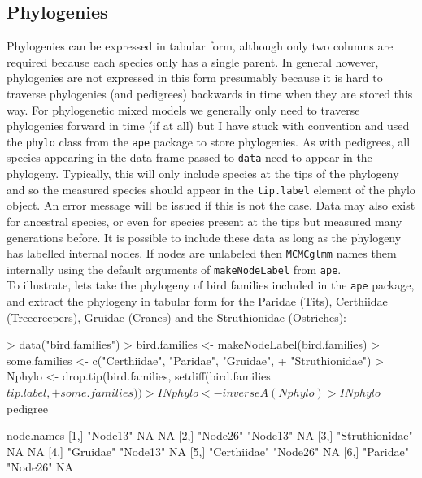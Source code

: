 \documentclass{article}
\begin{document}
\subsection{Phylogenies}

Phylogenies can be expressed in tabular form, although only two columns are required because each species only has a single parent. In general however,  phylogenies are not expressed in this form presumably because it is hard to traverse phylogenies (and pedigrees) backwards in time when they are stored this way. For phylogenetic mixed models we generally only need to traverse phylogenies forward in time (if at all) but I have stuck with convention and used the \texttt{phylo} class from the \texttt{ape} package to store phylogenies.  As with pedigrees, all species appearing in the data frame passed to \texttt{data} need to appear in the phylogeny. Typically, this will only include species at the tips of the phylogeny and so the measured species should appear in the \texttt{tip.label} element of the phylo object. An error message will be issued if this is not the case. Data may also exist for ancestral species, or even for species present at the tips but measured many generations before. It is possible to include these data as long as the phylogeny has labelled internal nodes. If nodes are unlabeled then  \texttt{MCMCglmm}  names them internally using the default arguments of   \texttt{makeNodeLabel} from \texttt{ape}.\\ 

To illustrate, lets take the phylogeny of bird families included in the \texttt{ape} package, and extract the phylogeny in tabular form for the Paridae (Tits), Certhiidae (Treecreepers), Gruidae (Cranes) and the Struthionidae (Ostriches):

\begin{Schunk}
\begin{Sinput}
> data("bird.families")
> bird.families <- makeNodeLabel(bird.families)
> some.families <- c("Certhiidae", "Paridae", "Gruidae", 
+     "Struthionidae")
> Nphylo <- drop.tip(bird.families, setdiff(bird.families$tip.label, 
+     some.families))
> INphylo <- inverseA(Nphylo)
> INphylo$pedigree
\end{Sinput}
\begin{Soutput}
     node.names                 
[1,] "Node13"        NA       NA
[2,] "Node26"        "Node13" NA
[3,] "Struthionidae" NA       NA
[4,] "Gruidae"       "Node13" NA
[5,] "Certhiidae"    "Node26" NA
[6,] "Paridae"       "Node26" NA
\end{Soutput}
\end{Schunk}
\end{document}
